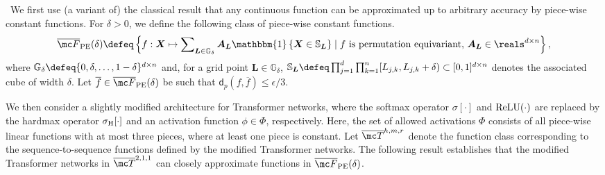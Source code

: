 \documentclass{article} %
\def\mA{{\bm{A}}}
\def\mL{{\bm{L}}}
\def\mX{{\bm{X}}}
\def\sG{{\mathbb{G}}}
\def\sS{{\mathbb{S}}}
\def\emL{{L}}
\newcommand{\sfmx}{\sigma}
\newcommand{\hdmx}{\sigma_{\rm H}}
\newcommand{\relu}{{\rm ReLU}}
\newcommand{\funcdist}{\mathsf{d}}
\renewcommand{\indic}[1]{\mathbbm{1}\left\{#1\right\}}
\begin{document}
\vspace{-2pt}
~We first use (a variant of) the classical result that any continuous function can be approximated up to arbitrary accuracy by piece-wise constant functions. For $\delta > 0$, we define the following class of piece-wise constant functions.
\begin{align*}
    \overline{\mc F}_{\rm PE}(\delta) \defeq
    \left \{ f: \mX \mapsto \sum\nolimits_{\mL \in \sG_{\delta}} \mA_\mL \indic{\mX \in \sS_\mL} 
    \mid
    f \text{ is permutation equivariant, } \mA_\mL \in \reals^{d \times n} \right \},
\end{align*}
where $\sG_{\delta} \defeq \{0, \delta, \dots, 1-\delta \}^{d \times n}$ and, for a grid point $\mL \in \sG_{\delta}$, $\sS_\mL \defeq \prod_{j=1}^d \prod_{k=1}^n [\emL_{j,k}, \emL_{j,k}+\delta) \subset [0,1]^{d \times n}$ denotes the associated cube of width $\delta$. Let $\overline{f} \in \overline{\mc F}_{\rm PE}(\delta)$ be such that $\funcdist_{p}(f, \overline{f}) \leq \epsilon/3$. 



\vspace{-2pt}
We then consider a slightly modified architecture for Transformer networks, where the softmax operator $\sfmx[\cdot]$ and $\relu(\cdot)$ are replaced by the hardmax operator $\hdmx[\cdot]$ and an activation function $\phi \in \Phi$, respectively. Here, the set of allowed activations $\Phi$ consists of all piece-wise linear functions with at most three pieces, where at least one piece is constant. Let $\overline{\mc T}^{h, m, r}$ denote the function class corresponding to the sequence-to-sequence functions defined by the modified Transformer networks. The following result establishes that the modified Transformer networks in $\overline{\mc T}^{2, 1, 1}$ can closely approximate functions in $\overline {\mc F}_{\rm PE}(\delta)$.
\end{document}
